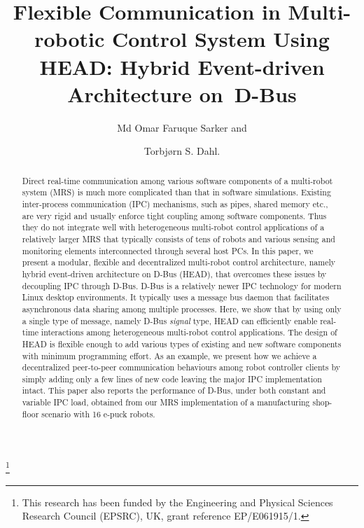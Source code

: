 \documentclass{ifacconf}
\begin{document}
\begin{frontmatter}
\title{Flexible Communication in Multi-robotic Control System Using HEAD: Hybrid Event-driven Architecture on~D-Bus   } 

\thanks[footnoteinfo]{This research has been funded by the Engineering and Physical Sciences Research Council (EPSRC), UK, grant reference EP/E061915/1.}

\author{Md Omar Faruque Sarker and } 
\author{Torbj{\o}rn S. Dahl.} 

\address{Robotic Intelligence Lab, University of Wales, Newport\\
Allt-yr-yn Campus, Allt-yr-yn Avenue, Newport, NP205DA, UK\\
 (e-mail: Mdomarfaruque.Sarker|Torbjorn.Dahl@newport.ac.uk)}

\begin{abstract}                %
Direct real-time communication among various software components of a multi-robot system (MRS) is much more complicated than that in software simulations. Existing inter-process communication (IPC) mechanisms, such as pipes, shared memory etc., are very rigid and usually enforce tight coupling among software components. Thus they do not integrate well with heterogeneous multi-robot control applications of a relatively larger MRS that typically consists of tens of robots and various sensing and monitoring elements interconnected through several host PCs. In this paper, we present a modular, flexible and decentralized multi-robot control architecture, namely hybrid event-driven architecture on D-Bus (HEAD), that overcomes these issues by decoupling IPC through D-Bus. D-Bus is a relatively newer IPC technology for modern Linux desktop environments. It typically uses a message bus daemon that facilitates asynchronous data sharing among multiple processes. Here, we show that by using only a single type of message, namely D-Bus {\em signal} type, HEAD can efficiently enable real-time interactions among heterogeneous multi-robot control applications. The design of HEAD is flexible enough to add various types of existing and new software components with minimum programming effort. As an example, we present how we achieve a decentralized peer-to-peer communication behaviours among robot controller clients by simply adding only a few lines of new code leaving the major IPC implementation intact. This paper also reports the performance of D-Bus, under both constant and variable IPC load, obtained from our MRS implementation of a manufacturing shop-floor scenario with 16 e-puck robots.
\end{abstract}


\end{frontmatter}
\end{document}
